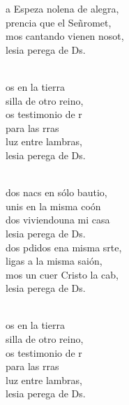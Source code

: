 \documentclass[12pt]{article}
\begin{document}
\begin{multicols*}{2}
\begin{cancion}
\jump
	a Espeza nolena de alegra,\\
	prencia que el Señromet, \\
	mos cantando vienen nosot,\\
	lesia perega de Ds.\\\jump\\
	\begin{chorus}%
	os en la tierra \\
	silla de otro reino,\\
	os testimonio de r\\
	 para las rras\\
	luz entre lambras,\\
	lesia perega de Ds.\\
	\end{chorus}%
	\jump\\
	dos nacs en sólo bautio,\\
	unis en la misma coón\\
	dos viviendouna mi casa \\
	lesia perega de Ds.\\
\jump
	dos pdidos ena misma srte,\\
	ligas a la misma saión,\\
	mos un cuer Cristo la cab,\\
	lesia perega de Ds.\\\jump\\
	\begin{chorus}%
	os en la tierra \\
	silla de otro reino,\\
	os testimonio de r\\
	 para las rras\\
	luz entre lambras,\\
	lesia perega de Ds.\\
	\end{chorus}%
	\jump\\
\end{cancion}%


\end{multicols*}
\end{document}
